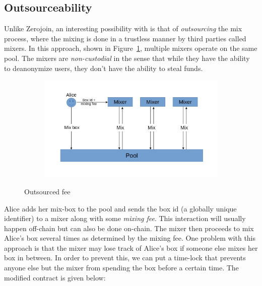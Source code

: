 \documentclass[runningheads]{llncs}
\newcommand{\zerojoin}{Zerojoin\xspace}
\begin{document}
\subsection{Outsourceability}

Unlike \zerojoin, an interesting possibility with \algname is that of {\em outsourcing} the mix process, where the mixing is done in a trustless manner by third parties called mixers. In this approach, shown in Figure~\ref{fig:joiner}, multiple mixers operate on the same pool. The mixers are {\em non-custodial} in the sense that while they have the ability to deanonymize users, they don't have the ability to steal funds.


\begin{figure}[ht]
\centering
\begin{subfigure}{0.8\textwidth}
\centering
\includegraphics[width=\linewidth]{Joiner.jpg}
\end{subfigure}%
\caption{Outsourced fee}
\label{fig:joiner}
\end{figure}

Alice adds her mix-box to the pool and sends the box id (a globally unique identifier) to a mixer along with some {\em mixing fee}.
This interaction will usually happen off-chain but can also be done on-chain. The mixer then proceeds to mix Alice's box several times as determined by the mixing fee.
One problem with this approach is that the mixer may lose track of Alice's box if someone else mixes her box in between. In order to prevent this, we can put a time-lock that prevents anyone else but the mixer from spending the box before a certain time. The modified contract is given below:
\end{document}
